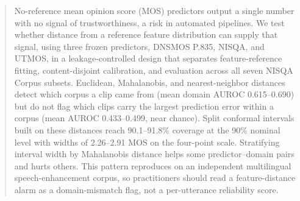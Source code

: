 
\begin{abstract}
No-reference mean opinion score (MOS) predictors output a single number with no signal of trustworthiness, a risk in automated pipelines. We test whether distance from a reference feature distribution can supply that signal, using three frozen predictors, DNSMOS P.835, NISQA, and UTMOS, in a leakage-controlled design that separates feature-reference fitting, content-disjoint calibration, and evaluation across all seven NISQA Corpus subsets. Euclidean, Mahalanobis, and nearest-neighbor distances detect which corpus a clip came from (mean domain AUROC 0.615--0.690) but do not flag which clips carry the largest prediction error within a corpus (mean AUROC 0.433--0.499, near chance). Split conformal intervals built on these distances reach 90.1--91.8\% coverage at the 90\% nominal level with widths of 2.26--2.91 MOS on the four-point scale. Stratifying interval width by Mahalanobis distance helps some predictor--domain pairs and hurts others. This pattern reproduces on an independent multilingual speech-enhancement corpus, so practitioners should read a feature-distance alarm as a domain-mismatch flag, not a per-utterance reliability score.
\end{abstract}
